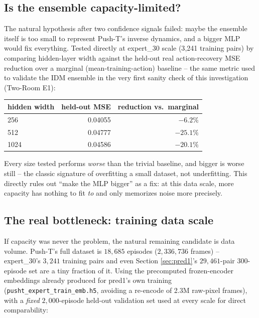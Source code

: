 \documentclass[11pt]{article}
\begin{document}
\subsection{Is the ensemble capacity-limited?}
\label{sec:capacity}

The natural hypothesis after two confidence signals failed: maybe the ensemble itself is too
small to represent Push-T's inverse dynamics, and a bigger MLP would fix everything. Tested
directly at expert\_30 scale (3{,}241 training pairs) by comparing hidden-layer width against
the held-out real action-recovery MSE reduction over a marginal (mean-training-action)
baseline -- the same metric used to validate the IDM ensemble in the very first sanity check
of this investigation (Two-Room E1):

\begin{center}
\begin{tabular}{@{}lrr@{}}
\toprule
hidden width & held-out MSE & reduction vs.\ marginal \\
\midrule
256  & 0.04055 & $-6.2\%$ \\
512  & 0.04777 & $-25.1\%$ \\
1024 & 0.04586 & $-20.1\%$ \\
\bottomrule
\end{tabular}
\end{center}

Every size tested performs \emph{worse} than the trivial baseline, and bigger is worse still
-- the classic signature of overfitting a small dataset, not underfitting. This directly rules
out ``make the MLP bigger'' as a fix: at this data scale, more capacity has nothing to fit
\emph{to} and only memorizes noise more precisely.

\subsection{The real bottleneck: training data scale}
\label{sec:datascale}

If capacity was never the problem, the natural remaining candidate is data volume. Push-T's
full dataset is $18{,}685$ episodes ($2{,}336{,}736$ frames) -- expert\_30's $3{,}241$ training
pairs and even Section \ref{sec:pred1}'s $29{,}461$-pair 300-episode set are a tiny fraction of
it. Using the precomputed frozen-encoder embeddings already produced for pred1's own training
(\texttt{pusht\_expert\_train\_emb.h5}, avoiding a re-encode of 2.3M raw-pixel frames), with a
\emph{fixed} $2{,}000$-episode held-out validation set used at every scale for direct
comparability:
\end{document}
